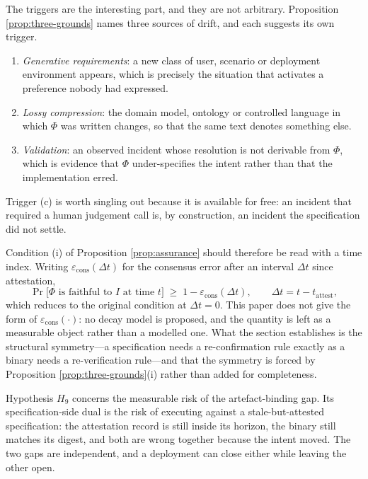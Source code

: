 The triggers are the interesting part, and they are not arbitrary. Proposition \ref{prop:three-grounds}
names three sources of drift, and each suggests its own trigger.
\begin{enumerate}[label=(\alph*)]
\item \emph{Generative requirements}: a new class of user, scenario or deployment environment appears,
      which is precisely the situation that activates a preference nobody had expressed.
\item \emph{Lossy compression}: the domain model, ontology or controlled language in which $\Phi$ was
      written changes, so that the same text denotes something else.
\item \emph{Validation}: an observed incident whose resolution is not derivable from $\Phi$, which is
      evidence that $\Phi$ under-specifies the intent rather than that the implementation erred.
\end{enumerate}
Trigger (c) is worth singling out because it is available for free: an incident that required a human
judgement call is, by construction, an incident the specification did not settle.

Condition (i) of Proposition \ref{prop:assurance} should therefore be read with a time index. Writing
$\varepsilon_{\text{cons}}(\Delta t)$ for the consensus error after an interval $\Delta t$ since
attestation,
\begin{equation}\label{eq:spec-decay}
\Pr\bigl[\Phi \text{ is faithful to } I \text{ at time } t\bigr] \;\ge\;
1 - \varepsilon_{\text{cons}}(\Delta t),
\qquad \Delta t = t - t_{\text{attest}},
\end{equation}
which reduces to the original condition at $\Delta t = 0$. This paper does not give the form of
$\varepsilon_{\text{cons}}(\cdot)$: no decay model is proposed, and the quantity is left as a
measurable object rather than a modelled one. What the section establishes is the structural
symmetry---a specification needs a re-confirmation rule exactly as a binary needs a re-verification
rule---and that the symmetry is forced by Proposition \ref{prop:three-grounds}(i) rather than added
for completeness.

\begin{remark}\label{rmk:spec-h9}
Hypothesis $H_9$ concerns the measurable risk of the artefact-binding gap. Its specification-side
dual is the risk of executing against a stale-but-attested specification: the attestation record is
still inside its horizon, the binary still matches its digest, and both are wrong together because
the intent moved. The two gaps are independent, and a deployment can close either while leaving the
other open.
\end{remark}

